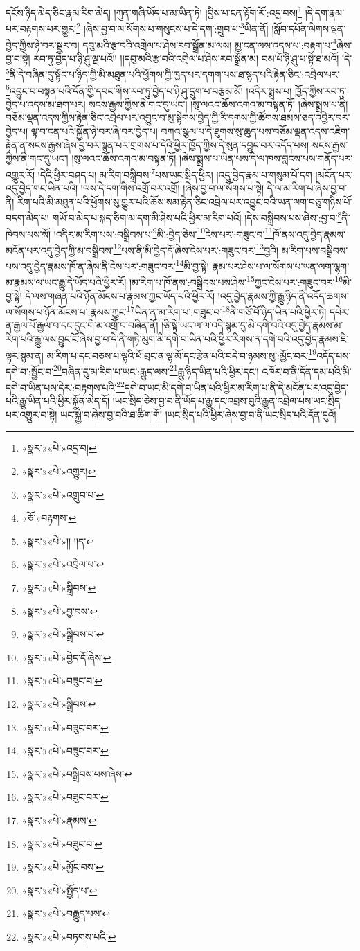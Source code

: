 དངོས་ཉིད་མེད་ཅིང་རྣམ་རིག་མེད། །ཀུན་གཞི་ཡོད་པ་མ་ཡིན་ཏེ། །བྱིས་པ་ངན་རྟོག་རོ་:འདྲ་བས།\footnote{«སྣར་»«པེ་»འདྲ་བ།} །དེ་དག་རྣམ་པར་བརྟགས་པར་གྱུར།\footnote{«སྣར་»«པེ་»འགྱུར།} །ཞེས་བྱ་བ་ལ་སོགས་པ་གསུངས་པ་དེ་དག་:གྲུབ་པ་\footnote{«སྣར་»«པེ་»འགྲུབ་པ་}ཡིན་ནོ། །སློབ་དཔོན་ལེགས་ལྡན་བྱེད་ཀྱིས་ཉེ་བར་སྦྱར་བ། དབུ་མའི་རྩ་བའི་འགྲེལ་པ་ཤེས་རབ་སྒྲོན་མ་ལས། མྱ་ངན་ལས་འདས་པ་:བརྟག་པ་\footnote{«ཅོ་»བརྟགས་}ཞེས་བྱ་བ་སྟེ། རབ་ཏུ་བྱེད་པ་ཉི་ཤུ་ལྔ་པའོ།། །།དབུ་མའི་རྩ་བའི་འགྲེལ་པ་ཤེས་རབ་སྒྲོན་མ། བམ་པོ་ཉི་ཤུ་པ་སྟེ་ཐ་མའོ། །དེ་\footnote{«སྣར་»«པེ་»།། །།ད་}ནི་དེ་བཞིན་དུ་སྟོང་པ་ཉིད་ཀྱི་མི་མཐུན་པའི་ཕྱོགས་ཀྱི་ཁྱད་པར་དགག་པས་ཐ་སྙད་པའི་རྟེན་ཅིང་:འབྲེལ་པར་\footnote{«སྣར་»«པེ་»འབྲེལ་པ་}འབྱུང་བ་བསྟན་པའི་དོན་གྱི་དབང་གིས་རབ་ཏུ་བྱེད་པ་ཉི་ཤུ་དྲུག་པ་བརྩམ་མོ། །འདིར་སྨྲས་པ། ཁྱོད་ཀྱིས་རབ་ཏུ་བྱེད་པ་འདས་མ་ཐག་པར། སངས་རྒྱས་ཀྱིས་ནི་གང་དུ་ཡང་། །སུ་ལའང་ཆོས་འགའ་མ་བསྟན་ཏོ། །ཞེས་སྨྲས་པ་ནི། བཅོམ་ལྡན་འདས་ཀྱིས་རྟེན་ཅིང་འབྲེལ་པར་འབྱུང་བ་མུ་སྟེགས་བྱེད་ཀྱི་རི་དགས་ཀྱི་ཚོགས་ཐམས་ཅད་འབྱེར་བར་བྱེད་པ། ལྟ་བ་ངན་པའི་སྐྱོན་ཉེ་བར་ཞི་བར་བྱེད་པ། བཀའ་སྩལ་པ་དེ་ཐུགས་སུ་ཆུད་པས་བཅོམ་ལྡན་འདས་འཇིག་རྟེན་ན་སངས་རྒྱས་ཞེས་བྱ་བར་སྙན་པར་གྲགས་པ་དེའི་ཕྱིར་ཁྱོད་ཀྱིས་དེ་སུན་དབྱུང་བར་འདོད་པས། སངས་རྒྱས་ཀྱིས་ནི་གང་དུ་ཡང་། །སུ་ལའང་ཆོས་འགའ་མ་བསྟན་ཏོ། །ཞེས་སྨྲས་པ་ཡིན་པས་དེ་ལ་ཁས་བླངས་པས་གནོད་པར་འགྱུར་རོ། །དེའི་ཕྱིར་བཤད་པ། མ་རིག་བསྒྲིབས་\footnote{«སྣར་»«པེ་»སྒྲིབས་}པས་ཡང་སྲིད་ཕྱིར། །འདུ་བྱེད་རྣམ་པ་གསུམ་པོ་དག །མངོན་པར་འདུ་བྱེད་གང་ཡིན་པའི། །ལས་དེ་དག་གིས་འགྲོ་བར་འགྲོ། །ཞེས་བྱ་བ་ལ་སོགས་པ་སྟེ། དེ་ལ་མ་རིག་པ་ཞེས་བྱ་བ་ནི། རིག་པའི་མི་མཐུན་པའི་ཕྱོགས་སུ་གྱུར་པའི་ཆོས་སམ་རྟེན་ཅིང་འབྲེལ་པར་འབྱུང་བའི་ཡན་ལག་བཅུ་གཉིས་པོ་བདག་མེད་པ། གཡོ་བ་མེད་པ་སྐད་ཅིག་མ་དག་མི་ཤེས་པའི་ཕྱིར་མ་རིག་པའོ། །དེས་བསྒྲིབས་པས་ཞེས་:བྱ་བ་\footnote{«སྣར་»«པེ་»བྱ་བས་}ནི་ཁེབས་པས་སོ། །འདིར་མ་རིག་པས་:བསྒྲིབས་པ་\footnote{«སྣར་»«པེ་»སྒྲིབས་པ་}མི་:བྱེད་ཅེས་\footnote{«སྣར་»«པེ་»བྱེད་དོ་ཞེས་}ངེས་པར་:གཟུང་བ་\footnote{«སྣར་»«པེ་»བཟུང་བ་}ཁོ་ནས་འདུ་བྱེད་རྣམས་མངོན་པར་འདུ་བྱེད་ཀྱི་མ་བསྒྲིབས་\footnote{«སྣར་»«པེ་»སྒྲིབས་}པས་ནི་མི་བྱེད་དོ་ཞེས་ངེས་པར་:གཟུང་བར་\footnote{«སྣར་»«པེ་»བཟུང་བར་}བྱའི། མ་རིག་པས་བསྒྲིབས་པས་འདུ་བྱེད་རྣམས་ཁོ་ན་ཞེས་ནི་ངེས་པར་:གཟུང་བར་\footnote{«སྣར་»«པེ་»བཟུང་བར་}མི་བྱ་སྟེ། རྣམ་པར་ཤེས་པ་ལ་སོགས་པ་ཡན་ལག་ལྷག་མ་རྣམས་ལ་ཡང་རྒྱུ་དེ་ཡོད་པའི་ཕྱིར་རོ། །མ་རིག་པ་ཁོ་ནས་:བསྒྲིབས་པས་ཤེས་\footnote{«སྣར་»«པེ་»བསྒྲིབས་པས་ཞེས་}ཀྱང་ངེས་པར་:གཟུང་བར་\footnote{«སྣར་»«པེ་»བཟུང་བར་}མི་བྱ་སྟེ། དེ་ལས་གཞན་པའི་ཉོན་མོངས་པ་རྣམས་ཀྱང་ཡོད་པའི་ཕྱིར་རོ། །འདུ་བྱེད་རྣམས་ཀྱི་རྒྱུ་ཉིད་ནི་འདོད་ཆགས་ལ་སོགས་པ་ཉོན་མོངས་པ་:རྣམས་ཀྱང་\footnote{«སྣར་»«པེ་»རྣམས་}ཡིན་ན་མ་རིག་པ་:གཟུང་བ་\footnote{«སྣར་»«པེ་»བཟུང་བ་}ནི་གཙོ་བོ་ཉིད་ཡིན་པའི་ཕྱིར་ཏེ། དཔེར་ན་རྒྱལ་པོ་རྒྱལ་བ་དང་དུང་གི་མ་འགྲོ་བ་བཞིན་ནོ། །ཅི་སྟེ་ཡང་ལ་ལ་འདི་སྙམ་དུ་མི་དགེ་བའི་འདུ་བྱེད་རྣམས་མ་རིག་པའི་རྒྱུ་ལས་བྱུང་ངོ་ཞེས་བྱ་བ་དེ་ནི་གཏི་མུག་མི་དགེ་བ་ཡིན་པའི་ཕྱིར་རིགས་ན་དགེ་བའི་འདུ་བྱེད་རྣམས་ཇི་ལྟར་སྙམ་ན། མ་རིག་པ་དང་བཅས་པ་ལྷའི་ཕོ་བྲང་ན་ལྷ་མོ་དང་རྩེན་པའི་བདེ་བ་ཉམས་སུ་:མྱོང་བར་\footnote{«སྣར་»«པེ་»མྱོང་བས་}འདོད་པས་དགེ་བ་:སྦྱོང་བ་\footnote{«སྣར་»«པེ་»སྤྱོད་པ་}བཞིན་དུ་མ་རིག་པ་ཡང་:རྒྱུད་ལས་\footnote{«སྣར་»«པེ་»བརྒྱུད་པས་}རྒྱུ་ཉིད་ཡིན་པའི་ཕྱིར་དང་། འཁོར་བ་ནི་དོན་དམ་པའི་མི་དགེ་བ་ཡིན་པས་དེར་:བརྟགས་པའི་\footnote{«སྣར་»«པེ་»བཏགས་པའི་}དགེ་བ་ཡང་མི་དགེ་བ་ཡིན་པའི་ཕྱིར་མ་རིག་པ་ནི་དེ་མངོན་པར་འདུ་བྱེད་པའི་རྒྱུ་ཡིན་པའི་ཕྱིར་སྐྱོན་མེད་དོ། །ཡང་སྲིད་ཅེས་བྱ་བ་ནི་ཡོད་པ་རྒྱུ་དང་འབྲས་བུའི་རྒྱུན་འབྲེལ་པས་ཡང་སྲིད་པར་འགྱུར་བ་སྟེ། ཡང་སྐྱེ་བ་ཞེས་བྱ་བའི་ཐ་ཚིག་གོ། །ཡང་སྲིད་པའི་ཕྱིར་ཞེས་བྱ་བ་ནི་ཡང་སྲིད་པའི་དོན་དུའོ། 